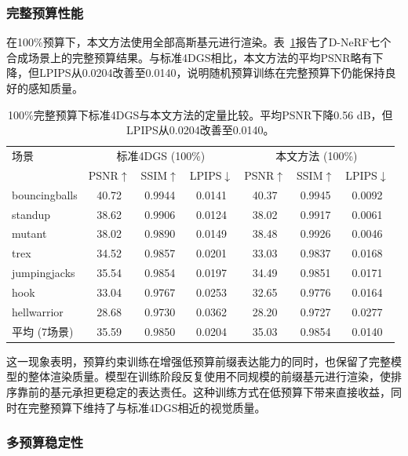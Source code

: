 \documentclass[sn-mathphys]{sn-jnl}
\begin{document}
\subsubsection{完整预算性能}

在100\%预算下，本文方法使用全部高斯基元进行渲染。表~\ref{tab:main_full}报告了D-NeRF七个合成场景上的完整预算结果。与标准4DGS相比，本文方法的平均PSNR略有下降，但LPIPS从0.0204改善至0.0140，说明随机预算训练在完整预算下仍能保持良好的感知质量。

\begin{table}[!htbp]
\caption{100\%完整预算下标准4DGS与本文方法的定量比较。平均PSNR下降0.56 dB，但LPIPS从0.0204改善至0.0140。}
\label{tab:main_full}
\centering
\small
\setlength{\tabcolsep}{4pt}
\begin{tabular}{lccc|ccc}
\toprule
场景 & \multicolumn{3}{c}{标准4DGS (100\%)} & \multicolumn{3}{c}{本文方法 (100\%)} \\
& PSNR$\uparrow$ & SSIM$\uparrow$ & LPIPS$\downarrow$ & PSNR$\uparrow$ & SSIM$\uparrow$ & LPIPS$\downarrow$ \\
\midrule
bouncingballs & 40.72 & 0.9944 & 0.0141 & 40.37 & 0.9945 & 0.0092 \\
standup       & 38.62 & 0.9906 & 0.0124 & 38.02 & 0.9917 & 0.0061 \\
mutant        & 38.02 & 0.9890 & 0.0149 & 38.48 & 0.9926 & 0.0046 \\
trex          & 34.52 & 0.9857 & 0.0201 & 33.03 & 0.9837 & 0.0168 \\
jumpingjacks  & 35.54 & 0.9854 & 0.0197 & 34.49 & 0.9851 & 0.0171 \\
hook          & 33.04 & 0.9767 & 0.0253 & 32.65 & 0.9776 & 0.0164 \\
hellwarrior   & 28.68 & 0.9730 & 0.0362 & 28.20 & 0.9727 & 0.0277 \\
\midrule
平均 (7场景)  & 35.59 & 0.9850 & 0.0204 & 35.03 & 0.9854 & 0.0140 \\
\bottomrule
\end{tabular}
\end{table}

这一现象表明，预算约束训练在增强低预算前缀表达能力的同时，也保留了完整模型的整体渲染质量。模型在训练阶段反复使用不同规模的前缀基元进行渲染，使排序靠前的基元承担更稳定的表达责任。这种训练方式在低预算下带来直接收益，同时在完整预算下维持了与标准4DGS相近的视觉质量。

\subsubsection{多预算稳定性}
\end{document}
